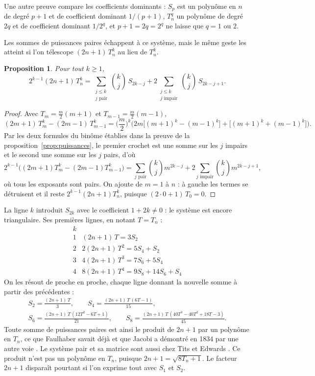 \documentclass[11pt,a4paper]{article}
\newtheorem{proposition}{Proposition}
\theoremstyle{remark}
\begin{document}
Une autre preuve compare les coefficients dominants : $S_p$ est un
polynôme en $n$ de degré $p + 1$ et de coefficient dominant $1/(p+1)$,
$T_n^q$ un polynôme de degré $2q$ et de coefficient dominant $1/2^q$, et
$p + 1 = 2q = 2^q$ ne laisse que $q = 1$ ou $2$.

Les sommes de puissances paires échappent à ce système, mais le même geste
les atteint si l'on télescope $(2n+1)\,T_n^k$ au lieu de $T_n^k$.

\begin{proposition}\label{prop:sommes-paires}
Pour tout $k \geq 1$,
\[
2^{k-1}(2n+1)\,T_n^k
= \sum_{\substack{j \leq k\\ j \text{ pair}}} \binom{k}{j}\,S_{2k-j}
+ 2\sum_{\substack{j \leq k\\ j \text{ impair}}} \binom{k}{j}\,S_{2k-j+1}.
\]
\end{proposition}

\begin{proof}
Avec $T_m = \frac{m}{2}(m+1)$ et $T_{m-1} = \frac{m}{2}(m-1)$,
\[
(2m+1)\,T_m^k - (2m-1)\,T_{m-1}^k
= \Big(\frac{m}{2}\Big)^{k}\Big(2m\big[(m+1)^k - (m-1)^k\big]
+ \big[(m+1)^k + (m-1)^k\big]\Big).
\]
Par les deux formules du binôme établies dans la preuve de la
proposition~\ref{prop:puissances}, le premier crochet est une somme sur les
$j$ impairs et le second une somme sur les $j$ pairs, d'où
\[
2^{k-1}\big((2m+1)T_m^k - (2m-1)T_{m-1}^k\big)
= \sum_{j \text{ pair}} \binom{k}{j} m^{2k-j}
+ 2\sum_{j \text{ impair}} \binom{k}{j} m^{2k-j+1},
\]
où tous les exposants sont pairs. On ajoute de $m = 1$ à $n$ : à gauche les
termes se détruisent et il reste $2^{k-1}(2n+1)T_n^k$, puisque
$(2 \cdot 0 + 1)\,T_0 = 0$.
\end{proof}

La ligne $k$ introduit $S_{2k}$ avec le coefficient $1 + 2k \neq 0$ : le
système est encore triangulaire. Ses premières lignes, en notant $T = T_n$ :
\[
\begin{array}{c|l}
k & \\ \hline
1 & (2n+1)\,T = 3S_2 \\
2 & 2(2n+1)\,T^2 = 5S_4 + S_2 \\
3 & 4(2n+1)\,T^3 = 7S_6 + 5S_4 \\
4 & 8(2n+1)\,T^4 = 9S_8 + 14S_6 + S_4
\end{array}
\]
On les résout de proche en proche, chaque ligne donnant la nouvelle somme à
partir des précédentes :
\begin{gather*}
S_2 = \frac{(2n+1)\,T}{3}, \qquad
S_4 = \frac{(2n+1)\,T\,(6T - 1)}{15}, \\
S_6 = \frac{(2n+1)\,T\,(12T^2 - 6T + 1)}{21}, \qquad
S_8 = \frac{(2n+1)\,T\,(40T^3 - 40T^2 + 18T - 3)}{45}.
\end{gather*}
Toute somme de puissances paires est ainsi le produit de $2n + 1$ par un
polynôme en $T_n$, ce que Faulhaber savait déjà et que Jacobi a démontré en
1834 par une autre voie \cite{knuth}. Le système pair et sa matrice sont
aussi chez Tits et Edwards \cite{tits,edwards}. Ce produit n'est pas un
polynôme en $T_n$, puisque $2n + 1 = \sqrt{8T_n + 1}$. Le facteur $2n+1$
disparaît pourtant si l'on exprime tout avec $S_1$ et $S_2$.
\end{document}
